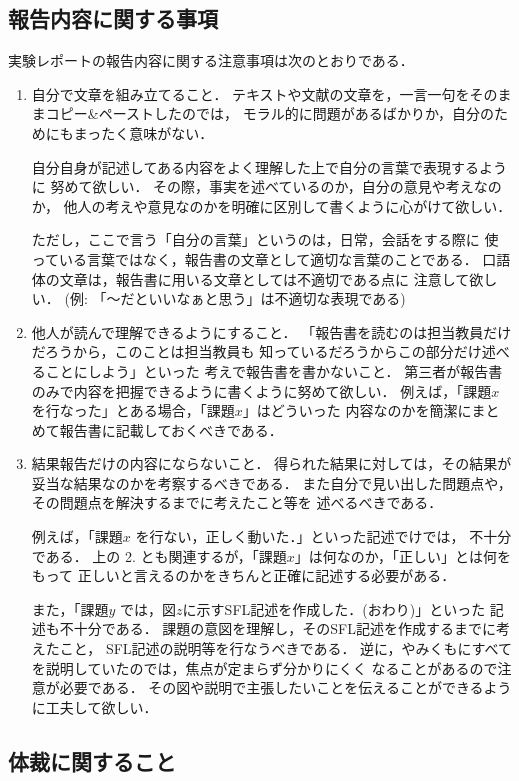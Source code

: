 \documentclass{jarticle}[11pt]
\begin{document}
\subsection{報告内容に関する事項}
実験レポートの報告内容に関する注意事項は次のとおりである．
\begin{enumerate}
\item 自分で文章を組み立てること．
テキストや文献の文章を，一言一句をそのままコピー\&ペーストしたのでは，
モラル的に問題があるばかりか，自分のためにもまったく意味がない．

自分自身が記述してある内容を{\gt よく理解した上で自分の言葉で表現する}ように
努めて欲しい．
その際，事実を述べているのか，自分の意見や考えなのか，
他人の考えや意見なのかを明確に区別して書くように心がけて欲しい．

ただし，ここで言う「自分の言葉」というのは，日常，会話をする際に
使っている言葉ではなく，報告書の文章として適切な言葉のことである．
{\gt 口語体の文章は，報告書に用いる文章としては不適切}である点に
注意して欲しい．
(例: 「〜だといいなぁと思う」は不適切な表現である)

\item 他人が読んで理解できるようにすること．
「報告書を読むのは担当教員だけだろうから，このことは担当教員も
知っているだろうからこの部分だけ述べることにしよう」といった
考えで報告書を書かないこと．
第三者が報告書のみで内容を把握できるように書くように努めて欲しい．
例えば，「課題$x$を行なった」とある場合，「課題$x$」はどういった
内容なのかを{\gt 簡潔にまとめて}報告書に記載しておくべきである．

\item 結果報告だけの内容にならないこと．
得られた結果に対しては，その結果が妥当な結果なのかを考察するべきである．
また自分で見い出した問題点や，その問題点を解決するまでに考えたこと等を
述べるべきである．

例えば，「課題$x$ を行ない，正しく動いた．」といった記述でけでは，
不十分である．
上の 2. とも関連するが，「課題$x$」は何なのか，「正しい」とは何をもって
正しいと言えるのかをきちんと正確に記述する必要がある．

また，「課題$y$ では，図$z$に示すSFL記述を作成した．(おわり)」といった
記述も不十分である．
課題の意図を理解し，そのSFL記述を作成するまでに考えたこと，
SFL記述の説明等を行なうべきである．
逆に，やみくもにすべてを説明していたのでは，焦点が定まらず分かりにくく
なることがあるので注意が必要である．
その図や説明で主張したいことを伝えることができるように工夫して欲しい．
\end{enumerate}

\subsection{体裁に関すること}
\end{document}
